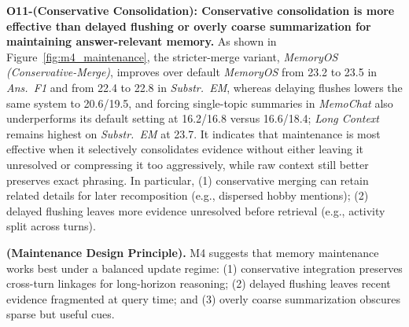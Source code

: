 \begin{sloppypar}
\noindent \textbf{O11-(Conservative Consolidation): Conservative consolidation is more effective than delayed flushing or overly coarse summarization for maintaining answer-relevant memory.}
As shown in Figure~\ref{fig:m4_maintenance}, the stricter-merge variant, \textit{MemoryOS (Conservative-Merge)}, improves over default \textit{MemoryOS} from 23.2 to 23.5 in \textit{Ans.\ F1} and from 22.4 to 22.8 in \textit{Substr.\ EM}, whereas delaying flushes lowers the same system to 20.6/19.5, and forcing single-topic summaries in \textit{MemoChat} also underperforms its default setting at 16.2/16.8 versus 16.6/18.4; \textit{Long Context} remains highest on \textit{Substr.\ EM} at 23.7.
It indicates that maintenance is most effective when it selectively consolidates evidence without either leaving it unresolved or compressing it too aggressively, while raw context still better preserves exact phrasing.
In particular, (1) conservative merging can retain related details for later recomposition (e.g., dispersed hobby mentions);
(2) delayed flushing leaves more evidence unresolved before retrieval (e.g., activity split across turns).
\end{sloppypar}

\begin{findingbox}
\textbf{(Maintenance Design Principle).} M4 suggests that memory maintenance works best under a balanced update regime: 
(1) conservative integration preserves cross-turn linkages for long-horizon reasoning; 
(2) delayed flushing leaves recent evidence fragmented at query time; 
and (3) overly coarse summarization obscures sparse but useful cues.
\end{findingbox}

